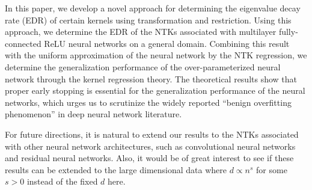 
In this paper, we develop a novel approach for determining the eigenvalue decay rate (EDR) of certain kernels using transformation and restriction.
Using this approach, we determine the EDR of the NTKs associated with multilayer fully-connected ReLU neural networks on a general domain.
Combining this result with the uniform approximation of the neural network by the NTK regression,
we determine the generalization performance of the over-parameterized neural network through the kernel regression theory.
The theoretical results show that proper early stopping is essential for the generalization performance of the neural networks,
which urges us to scrutinize the widely reported ``benign overfitting phenomenon'' in deep neural network literature.

For future directions, it is natural to extend our results to the NTKs associated with other neural network architectures,
such as convolutional neural networks and residual neural networks.
Also, it would be of great interest to see if these results can be extended to the large dimensional data where $d \propto n^{s}$ for some $s>0$ instead of the fixed $d$ here.